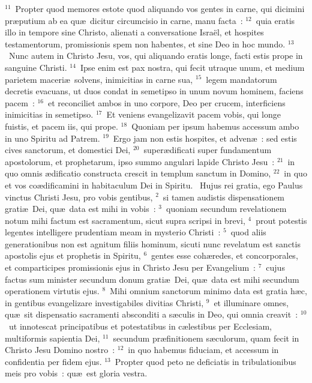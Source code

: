 ${}^{11}$~Propter quod memores estote quod aliquando vos gentes in carne, qui dicimini pr\ae putium ab ea qu\ae\ dicitur circumcisio in carne, manu facta~:
${}^{12}$~quia eratis illo in tempore sine Christo, alienati a conversatione Isra\"el, et hospites testamentorum, promissionis spem non habentes, et sine Deo in hoc mundo.
${}^{13}$~Nunc autem in Christo Jesu, vos, qui aliquando eratis longe, facti estis prope in sanguine Christi.
${}^{14}$~Ipse enim est pax nostra, qui fecit utraque unum, et medium parietem maceri\ae\ solvens, inimicitias in carne sua,
${}^{15}$~legem mandatorum decretis evacuans, ut duos condat in semetipso in unum novum hominem, faciens pacem~:
${}^{16}$~et reconciliet ambos in uno corpore, Deo per crucem, interficiens inimicitias in semetipso.
${}^{17}$~Et veniens evangelizavit pacem vobis, qui longe fuistis, et pacem iis, qui prope.
${}^{18}$~Quoniam per ipsum habemus accessum ambo in uno Spiritu ad Patrem.
${}^{19}$~Ergo jam non estis hospites, et adven\ae~: sed estis cives sanctorum, et domestici Dei,
${}^{20}$~super\ae dificati super fundamentum apostolorum, et prophetarum, ipso summo angulari lapide Christo Jesu~:
${}^{21}$~in quo omnis \ae dificatio constructa crescit in templum sanctum in Domino,
${}^{22}$~in quo et vos co\ae dificamini in habitaculum Dei in Spiritu.
~\lettrine[lines=10,image=true,loversize=0.05,lraise=-0.03]{H}{}ujus rei gratia, ego Paulus vinctus Christi Jesu, pro vobis gentibus,
${}^{2}$~si tamen audistis dispensationem grati\ae\ Dei, qu\ae\ data est mihi in vobis~:
${}^{3}$~quoniam secundum revelationem notum mihi factum est sacramentum, sicut supra scripsi in brevi,
${}^{4}$~prout potestis legentes intelligere prudentiam meam in mysterio Christi~:
${}^{5}$~quod aliis generationibus non est agnitum filiis hominum, sicuti nunc revelatum est sanctis apostolis ejus et prophetis in Spiritu,
${}^{6}$~gentes esse coh\ae redes, et concorporales, et comparticipes promissionis ejus in Christo Jesu per Evangelium~:
${}^{7}$~cujus factus sum minister secundum donum grati\ae\ Dei, qu\ae\ data est mihi secundum operationem virtutis ejus.
${}^{8}$~Mihi omnium sanctorum minimo data est gratia h\ae c, in gentibus evangelizare investigabiles divitias Christi,
${}^{9}$~et illuminare omnes, qu\ae\ sit dispensatio sacramenti absconditi a s\ae culis in Deo, qui omnia creavit~:
${}^{10}$~ut innotescat principatibus et potestatibus in c\ae lestibus per Ecclesiam, multiformis sapientia Dei,
${}^{11}$~secundum pr\ae finitionem s\ae culorum, quam fecit in Christo Jesu Domino nostro~:
${}^{12}$~in quo habemus fiduciam, et accessum in confidentia per fidem ejus.
${}^{13}$~Propter quod peto ne deficiatis in tribulationibus meis pro vobis~: qu\ae\ est gloria vestra.


